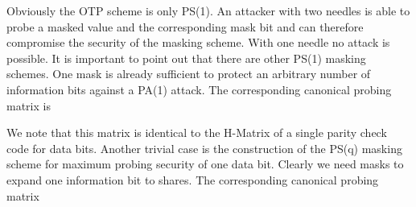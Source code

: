 \documentclass[11pt]{llncs}
\begin{document}
Obviously the OTP scheme is only PS(1).
An attacker with two needles is able to probe a masked value
and the corresponding mask bit and can therefore compromise the
security of the masking scheme. With one needle no attack is possible.
It is important to point out that there are other PS(1) masking schemes.
One mask is already sufficient to protect an arbitrary
number of  information bits against a PA(1) attack.
The corresponding canonical probing matrix is

We note that this matrix is identical to the H-Matrix of a single
parity check code for  data bits.
Another trivial case is the construction of the PS(q)
masking scheme for maximum probing security of one data bit.
Clearly we need  masks to expand one information bit to  shares.
The corresponding canonical probing matrix
\end{document}
